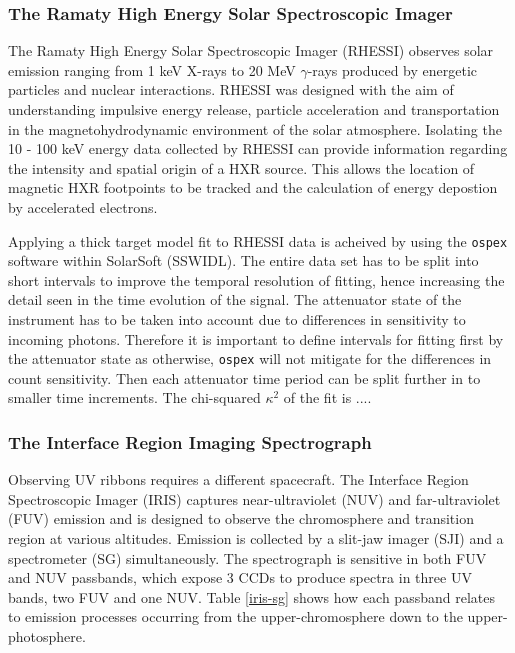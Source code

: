 \subsubsection{The Ramaty High Energy Solar Spectroscopic Imager}\label{rhessi}
The Ramaty High Energy Solar Spectroscopic Imager (RHESSI) observes solar emission ranging from 1 keV X-rays to 20 MeV $\gamma$-rays produced by energetic particles and nuclear interactions. RHESSI was designed with the aim of understanding impulsive energy release, particle acceleration and transportation in the magnetohydrodynamic environment of the solar atmosphere. Isolating the 10 - 100 keV energy data collected by RHESSI can provide information regarding the intensity and spatial origin of a HXR source. This allows the location of magnetic HXR footpoints to be tracked and the calculation of energy depostion by accelerated electrons. 
  
Applying a thick target model fit to RHESSI data is acheived by using the \texttt{ospex} software within SolarSoft (SSWIDL). The entire data set has to be split into short intervals to improve the temporal resolution of fitting, hence increasing the detail seen in the time evolution of the signal. The attenuator state of the instrument has to be taken into account due to differences in sensitivity to incoming photons. Therefore it is important to define intervals for fitting first by the attenuator state as otherwise, \texttt{ospex} will not mitigate for the differences in count sensitivity. Then each attenuator time period can be split further in to smaller time increments. The chi-squared $\kappa^{2}$ of the fit is ....

\subsubsection{The Interface Region Imaging Spectrograph}
Observing UV ribbons requires a different spacecraft. The Interface Region Spectroscopic Imager (IRIS) captures near-ultraviolet (NUV) and far-ultraviolet (FUV) emission and is designed to observe the chromosphere and transition region at various altitudes. Emission is collected by a slit-jaw imager (SJI) and a spectrometer (SG) simultaneously. The spectrograph is sensitive in both FUV and NUV passbands, which expose 3 CCDs to produce spectra in three UV bands, two FUV and one NUV. Table \ref{iris-sg} shows how each passband relates to emission processes occurring from the upper-chromosphere down to the upper-photosphere.

